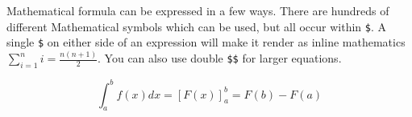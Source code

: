 \documentclass{article}
\begin{document}
Mathematical formula can be expressed in a few ways. There are hundreds of different Mathematical symbols which can be used, but all occur within \verb|$|. A single \verb|$| on either side of an expression will make it render as inline mathematics $\sum_{i=1}^{n}i=\frac{n(n+1)}{2}$. You can also use double \verb|$$| for larger equations.

$$\int_{a}^{b}f(x)dx=\left[F(x)\right]_{a}^{b}=F(b)-F(a)$$
\end{document}
